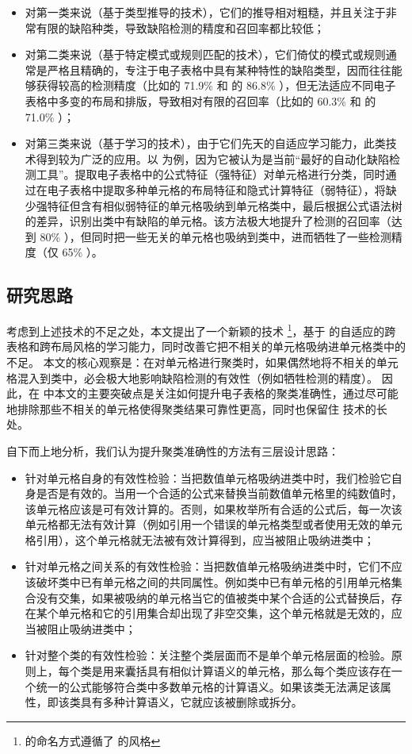 \begin{itemize}
    \item 对第一类来说（基于类型推导的技术），它们的推导相对粗糙，并且关注于非常有限的缺陷种类，导致缺陷检测的精度和召回率都比较低\cite{zhang2017effectively}；
    \item 对第二类来说（基于特定模式或规则匹配的技术），它们倚仗的模式或规则通常是严格且精确的，专注于电子表格中具有某种特性的缺陷类型，因而往往能够获得较高的检测精度（比如\am 的 71.9\% 和 \ca 的 86.8\% \cite{dou2017cacheck}），但无法适应不同电子表格中多变的布局和排版，导致相对有限的召回率（比如\am 的 60.3\% 和 \ca 的 71.0\% \cite{dou2017cacheck}）；
    \item 对第三类来说（基于学习的技术），由于它们先天的自适应学习能力，此类技术得到较为广泛的应用。以 \cu \cite{cheung2016custodes} 为例，因为它被认为是当前“最好的自动化缺陷检测工具”\cite{Barowy2018excelint}。\cu 提取电子表格中的公式特征（强特征）对单元格进行分类，同时通过在电子表格中提取多种单元格的布局特征和隐式计算特征（弱特征），将缺少强特征但含有相似弱特征的单元格吸纳到单元格类中，最后根据公式语法树的差异，识别出类中有缺陷的单元格。该方法极大地提升了检测的召回率（达到 80\% \cite{cheung2016custodes}），但同时把一些无关的单元格也吸纳到类中，进而牺牲了一些检测精度（仅 65\% \cite{cheung2016custodes}）。 
\end{itemize}

\subsection{研究思路}
考虑到上述技术的不足之处，本文提出了一个新颖的技术 \wa \footnote{\wa 的命名方式遵循了 \cu 的风格}，基于 \cu 的自适应的跨表格和跨布局风格的学习能力，同时改善它把不相关的单元格吸纳进单元格类中的不足。
本文的核心观察是：在对单元格进行聚类时，如果偶然地将不相关的单元格混入到类中，必会极大地影响缺陷检测的有效性（例如牺牲检测的精度）。
因此，在 \wa 中本文的主要突破点是关注如何提升电子表格的聚类准确性，通过尽可能地排除那些不相关的单元格使得聚类结果可靠性更高，同时也保留住 \cu 技术的长处。

自下而上地分析，我们认为提升聚类准确性的方法有三层设计思路：
\begin{itemize}
    \item 针对单元格自身的有效性检验：当把数值单元格吸纳进类中时，我们检验它自身是否是有效的。当用一个合适的公式来替换当前数值单元格里的纯数值时，该单元格应该是可有效计算的。否则，如果枚举所有合适的公式后，每一次该单元格都无法有效计算（例如引用一个错误的单元格类型或者使用无效的单元格引用），这个单元格就无法被有效计算得到，应当被阻止吸纳进类中；
    \item 针对单元格之间关系的有效性检验：当把数值单元格吸纳进类中时，它们不应该破坏类中已有单元格之间的共同属性。例如类中已有单元格的引用单元格集合没有交集，如果被吸纳的单元格当它的值被类中某个合适的公式替换后，存在某个单元格和它的引用集合却出现了非空交集，这个单元格就是无效的，应当被阻止吸纳进类中；
    \item 针对整个类的有效性检验：关注整个类层面而不是单个单元格层面的检验。原则上，每个类是用来囊括具有相似计算语义的单元格，那么每个类应该存在一个统一的公式能够符合类中多数单元格的计算语义。如果该类无法满足该属性，即该类具有多种计算语义，它就应该被删除或拆分。
\end{itemize}

